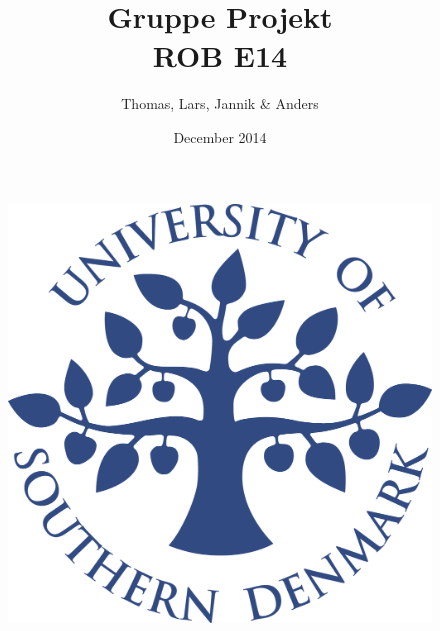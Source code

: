 \title{Gruppe Projekt \\ ROB E14}
\author{Thomas, Lars, Jannik \& Anders}
\date{December 2014}
\begin{figure}
\centering
\includegraphics[width=1\textwidth]{graphics/forside.png}
\end{figure}
\maketitle
